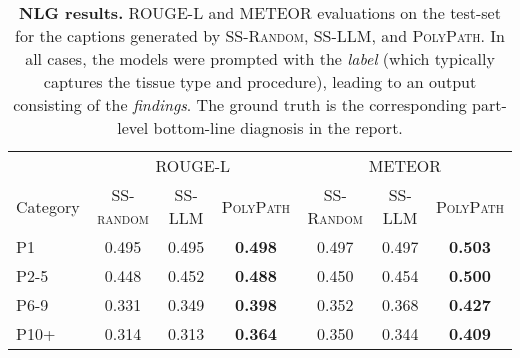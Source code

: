 \documentclass[11pt]{article}
\newcommand{\ourmodel}{\textsc{PolyPath}\xspace}
\newcommand{\randommodel}{\textsc{SS-Random}\xspace}
\newcommand{\llmmodel}{\textsc{SS-LLM}\xspace}
\begin{document}
\begin{table}[t]
\small
\centering
\caption{\small \textbf{NLG results.} ROUGE-L and METEOR evaluations on the test-set for the captions generated by \randommodel, \llmmodel, and \ourmodel. In all cases, the models were prompted with the \emph{label} (which typically captures the tissue type and procedure), leading to an output consisting of the \emph{findings}. The ground truth is the corresponding part-level bottom-line diagnosis in the report.}
\begin{tabular}{@{} l *{3}{c} *{3}{c} @{}}
\toprule
 & \multicolumn{3}{c}{ROUGE-L} & \multicolumn{3}{c}{METEOR} \\
\cmidrule(lr){2-4} \cmidrule(lr){5-7}
Category & \textsc{SS-random} & \textsc{SS-LLM} & \ourmodel & \randommodel & \llmmodel & \ourmodel \\
\midrule
\textsc{P1} & 0.495 & 0.495 & \textbf{0.498} & 0.497 & 0.497 & \textbf{0.503} \\
\textsc{P2-5} & 0.448 & 0.452 & \textbf{0.488} & 0.450 & 0.454 & \textbf{0.500} \\
\textsc{P6-9} & 0.331 & 0.349 & \textbf{0.398} & 0.352 & 0.368 & \textbf{0.427} \\
\textsc{P10+} & 0.314 & 0.313 & \textbf{0.364} & 0.350 & 0.344 & \textbf{0.409} \\
\bottomrule
\end{tabular}
\label{tab:nlg_main}
\end{table}
\end{document}
